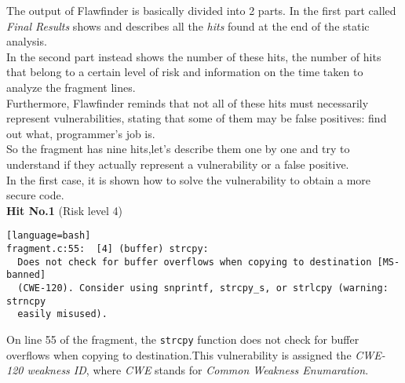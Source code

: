 \documentclass[a4paper,12pt]{article}
\begin{document}
The output of Flawfinder is basically divided into 2 parts.
In the first part called \textit{Final Results} shows and describes all the \textit{hits} found at the end of the static analysis.\\
In the second part instead shows the number of these hits, the number of hits that belong to a certain level of risk and information on the time taken to analyze the fragment lines.\\
Furthermore, Flawfinder reminds that not all of these hits must necessarily represent vulnerabilities, stating that some of them may be false positives: find out what, programmer's job is.\\
So the fragment has nine hits,let's describe them one by one and try to understand if they actually represent a vulnerability or a false positive.\\
In the first case, it is shown how to solve the vulnerability to obtain a more secure code.\\
\newpage
\textbf{Hit No.1} (Risk level 4)
\begin{lstlisting}[style=DOS][language=bash]
fragment.c:55:  [4] (buffer) strcpy:
  Does not check for buffer overflows when copying to destination [MS-banned]
  (CWE-120). Consider using snprintf, strcpy_s, or strlcpy (warning: strncpy
  easily misused).
\end{lstlisting}
On line 55 of the fragment, the \texttt{strcpy} function does not check for buffer overflows when copying to destination.This vulnerability is assigned the \textit{CWE-120 weakness ID}, where \textit{CWE} stands for \textit{Common Weakness Enumaration}\cite{CWE}.\\
\end{document}
